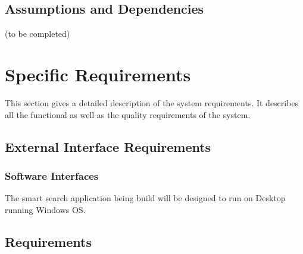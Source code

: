 \documentclass[a4paper,10pt]{article}
\begin{document}
    	\subsection{Assumptions and Dependencies}
(to be completed)

	\newpage
		
	\section{Specific Requirements}
This section gives a detailed description of the system requirements. It describes all the functional as well as the quality requirements of the system.

	\subsection{External Interface Requirements}

            \subsubsection{Software Interfaces}
The smart search application being build will be designed to run on Desktop running Windows OS.

	\subsection{Requirements}
\end{document}
